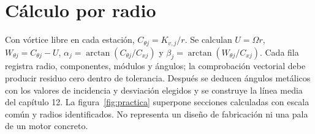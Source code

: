 \documentclass[10pt,openany]{book}
\begin{document}
\section{Cálculo por radio}

Con vórtice libre en cada estación, \(C_{\theta j}=K_{v,j}/r\). Se calculan \(U=\Omega r\), \(W_{\theta j}=C_{\theta j}-U\), \(\alpha_j=\arctan(C_{\theta j}/C_{xj})\) y \(\beta_j=\arctan(W_{\theta j}/C_{xj})\). Cada fila registra radio, componentes, módulos y ángulos; la comprobación vectorial debe producir residuo cero dentro de tolerancia.
Después se deducen ángulos metálicos con los valores de incidencia y desviación elegidos y se construye la línea media del capítulo 12. La figura~\ref{fig:practica} superpone secciones calculadas con escala común y radios identificados. No representa un diseño de fabricación ni una pala de un motor concreto.
\end{document}
